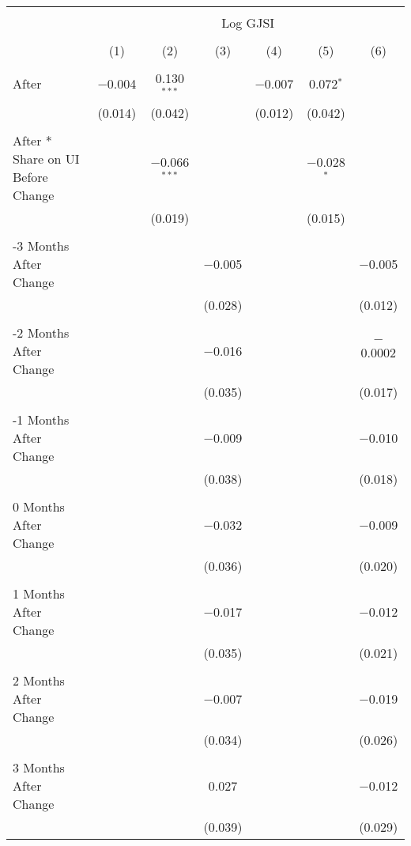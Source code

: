 
\begin{tabular}{@{\extracolsep{5pt}}lcccccc} 
\\[-1.8ex]\hline 
\hline \\[-1.8ex] 
 & \multicolumn{6}{c}{Log GJSI} \\ 
\cline{2-7} 
\\[-1.8ex] & (1) & (2) & (3) & (4) & (5) & (6)\\ 
\hline \\[-1.8ex] 
 After & $-$0.004 & 0.130$^{***}$ &  & $-$0.007 & 0.072$^{*}$ &  \\ 
  & (0.014) & (0.042) &  & (0.012) & (0.042) &  \\ 
  & & & & & & \\ 
 After * Share on UI Before Change &  & $-$0.066$^{***}$ &  &  & $-$0.028$^{*}$ &  \\ 
  &  & (0.019) &  &  & (0.015) &  \\ 
  & & & & & & \\ 
 -3 Months After Change &  &  & $-$0.005 &  &  & $-$0.005 \\ 
  &  &  & (0.028) &  &  & (0.012) \\ 
  & & & & & & \\ 
 -2 Months After Change &  &  & $-$0.016 &  &  & $-$0.0002 \\ 
  &  &  & (0.035) &  &  & (0.017) \\ 
  & & & & & & \\ 
 -1 Months After Change &  &  & $-$0.009 &  &  & $-$0.010 \\ 
  &  &  & (0.038) &  &  & (0.018) \\ 
  & & & & & & \\ 
 0 Months After Change &  &  & $-$0.032 &  &  & $-$0.009 \\ 
  &  &  & (0.036) &  &  & (0.020) \\ 
  & & & & & & \\ 
 1 Months After Change &  &  & $-$0.017 &  &  & $-$0.012 \\ 
  &  &  & (0.035) &  &  & (0.021) \\ 
  & & & & & & \\ 
 2 Months After Change &  &  & $-$0.007 &  &  & $-$0.019 \\ 
  &  &  & (0.034) &  &  & (0.026) \\ 
  & & & & & & \\ 
 3 Months After Change &  &  & 0.027 &  &  & $-$0.012 \\ 
  &  &  & (0.039) &  &  & (0.029) \\ 

\end{tabular}
